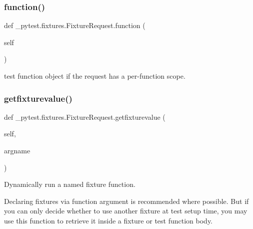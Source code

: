 \subsubsection{\texorpdfstring{function()}{function()}}
{\footnotesize\ttfamily def \+\_\+pytest.\+fixtures.\+Fixture\+Request.\+function (\begin{DoxyParamCaption}\item[{}]{self }\end{DoxyParamCaption})}

\begin{DoxyVerb}test function object if the request has a per-function scope. \end{DoxyVerb}
 \mbox{\label{class__pytest_1_1fixtures_1_1_fixture_request_adcdc72e4da6ef0a8fe5a58f4f6800d2f}} 
\subsubsection{\texorpdfstring{getfixturevalue()}{getfixturevalue()}}
{\footnotesize\ttfamily def \+\_\+pytest.\+fixtures.\+Fixture\+Request.\+getfixturevalue (\begin{DoxyParamCaption}\item[{}]{self,  }\item[{}]{argname }\end{DoxyParamCaption})}

\begin{DoxyVerb}Dynamically run a named fixture function.

Declaring fixtures via function argument is recommended where possible.
But if you can only decide whether to use another fixture at test
setup time, you may use this function to retrieve it inside a fixture
or test function body.
\end{DoxyVerb}
 \mbox{\label{class__pytest_1_1fixtures_1_1_fixture_request_ad3fb29fde8a0deb9f3f84d9b7de5fa78}} 
